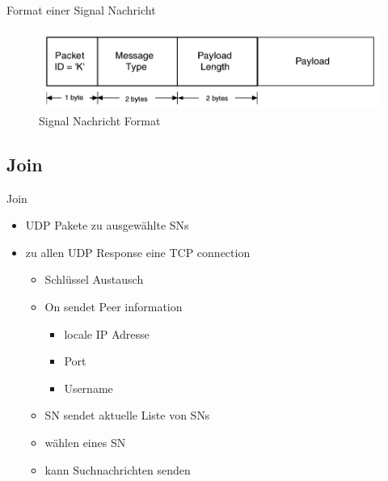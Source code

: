 \documentclass[ucs,9pt]{beamer}
\begin{document}
\begin{frame}{Format einer Signal Nachricht}
\begin{figure}
\includegraphics[scale=0.3]{images/signal_message}
\caption{Signal Nachricht Format}
\end{figure}
\end{frame}

\subsection{Join}

\begin{frame}{Join}
\begin{itemize}
\item UDP Pakete zu ausgewählte SNs
\item zu allen UDP Response eine TCP connection
	\begin{itemize}
	\item Schlüssel Austausch
	\item On sendet Peer information
		\begin{itemize}
		\item locale IP Adresse
		\item Port
		\item Username
		\end{itemize}
	\item SN sendet aktuelle Liste von SNs
	\item wählen eines SN
	\item kann Suchnachrichten senden
	\end{itemize}
\end{itemize}
\end{frame}
\end{document}
